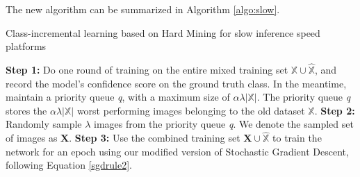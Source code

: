 The new algorithm can be summarized in Algorithm \ref{algo:slow}.

\begin{algorithm}
	\caption{Class-incremental learning based on Hard Mining for slow inference speed platforms}
	\label{algo:slow}
	\begin{algorithmic}
		\State \textbf{Step 1:} Do one round of training on the entire mixed training set $\mathbb{X}\cup \hat{\mathbb{X}}$, and record the model's confidence score on the ground truth class. In the meantime, maintain a priority queue \textit{q}, with a maximum size of $\alpha \lambda |\mathbb{X}|$. The priority queue \textit{q} stores the $\alpha \lambda |\mathbb{X}|$ worst performing images belonging to the old dataset $\mathbb{X}$.
		\State \textbf{Step 2:} Randomly sample $\lambda$ images from the priority queue \textit{q}. We denote the sampled set of images as $\mathbf{X}$. 
		\State \textbf{Step 3:} Use the combined training set $\mathbf{X} \cup \hat{\mathbb{X}}$ to train the network for an epoch using our modified version of Stochastic Gradient Descent, following Equation \ref{sgdrule2}.
		\EndFor
	\end{algorithmic}
\end{algorithm}









